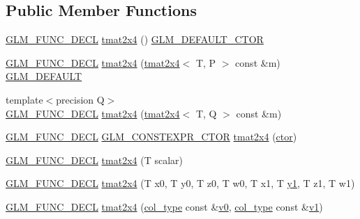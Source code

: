 \subsection*{Public Member Functions}
\begin{DoxyCompactItemize}
\item 
\mbox{\hyperlink{setup_8hpp_ab2d052de21a70539923e9bcbf6e83a51}{G\+L\+M\+\_\+\+F\+U\+N\+C\+\_\+\+D\+E\+CL}} \mbox{\hyperlink{structglm_1_1tmat2x4_a7ff66efb5ac0214a8621e3251176b7d9}{tmat2x4}} () \mbox{\hyperlink{setup_8hpp_afb97a4e995bc004c0cbbfa22125b80ba}{G\+L\+M\+\_\+\+D\+E\+F\+A\+U\+L\+T\+\_\+\+C\+T\+OR}}
\item 
\mbox{\hyperlink{setup_8hpp_ab2d052de21a70539923e9bcbf6e83a51}{G\+L\+M\+\_\+\+F\+U\+N\+C\+\_\+\+D\+E\+CL}} \mbox{\hyperlink{structglm_1_1tmat2x4_a4f619511e1e69d88ca2bfb4e69702a91}{tmat2x4}} (\mbox{\hyperlink{structglm_1_1tmat2x4}{tmat2x4}}$<$ T, P $>$ const \&m) \mbox{\hyperlink{setup_8hpp_aefce7051c376a64ba89fa93a9f63bc2c}{G\+L\+M\+\_\+\+D\+E\+F\+A\+U\+LT}}
\item 
{\footnotesize template$<$precision Q$>$ }\\\mbox{\hyperlink{setup_8hpp_ab2d052de21a70539923e9bcbf6e83a51}{G\+L\+M\+\_\+\+F\+U\+N\+C\+\_\+\+D\+E\+CL}} \mbox{\hyperlink{structglm_1_1tmat2x4_acde6e5b863afd65e1608a8fe2a374d53}{tmat2x4}} (\mbox{\hyperlink{structglm_1_1tmat2x4}{tmat2x4}}$<$ T, Q $>$ const \&m)
\item 
\mbox{\hyperlink{setup_8hpp_ab2d052de21a70539923e9bcbf6e83a51}{G\+L\+M\+\_\+\+F\+U\+N\+C\+\_\+\+D\+E\+CL}} \mbox{\hyperlink{setup_8hpp_ad34178a09666081abdb573c14d1f4a5a}{G\+L\+M\+\_\+\+C\+O\+N\+S\+T\+E\+X\+P\+R\+\_\+\+C\+T\+OR}} \mbox{\hyperlink{structglm_1_1tmat2x4_a62cb4837f5a4f1ce13180b7244ae18f9}{tmat2x4}} (\mbox{\hyperlink{namespaceglm_a807df837905ec286f806a536af03b57f}{ctor}})
\item 
\mbox{\hyperlink{setup_8hpp_ab2d052de21a70539923e9bcbf6e83a51}{G\+L\+M\+\_\+\+F\+U\+N\+C\+\_\+\+D\+E\+CL}} \mbox{\hyperlink{structglm_1_1tmat2x4_a505b0400c0e78d9ff5af6b35e2896a6c}{tmat2x4}} (T scalar)
\item 
\mbox{\hyperlink{setup_8hpp_ab2d052de21a70539923e9bcbf6e83a51}{G\+L\+M\+\_\+\+F\+U\+N\+C\+\_\+\+D\+E\+CL}} \mbox{\hyperlink{structglm_1_1tmat2x4_a91cbda002eac92848fa933cf76e5fb30}{tmat2x4}} (T x0, T y0, T z0, T w0, T x1, T \mbox{\hyperlink{glad_8h_a48340161068d267815ac3131e9d03def}{y1}}, T z1, T w1)
\item 
\mbox{\hyperlink{setup_8hpp_ab2d052de21a70539923e9bcbf6e83a51}{G\+L\+M\+\_\+\+F\+U\+N\+C\+\_\+\+D\+E\+CL}} \mbox{\hyperlink{structglm_1_1tmat2x4_ab80c8f32add0a9897a7d179597f07a25}{tmat2x4}} (\mbox{\hyperlink{structglm_1_1tmat2x4_a9effcccd2c4c50c385e4c3a2fe2feedb}{col\+\_\+type}} const \&\mbox{\hyperlink{glad_8h_a7062a23d1d434121d4a88f530703d06a}{v0}}, \mbox{\hyperlink{structglm_1_1tmat2x4_a9effcccd2c4c50c385e4c3a2fe2feedb}{col\+\_\+type}} const \&\mbox{\hyperlink{glad_8h_a0779c3b73f9aa3a0ac5b0139b5d291d9}{v1}})

\end{DoxyCompactItemize}
